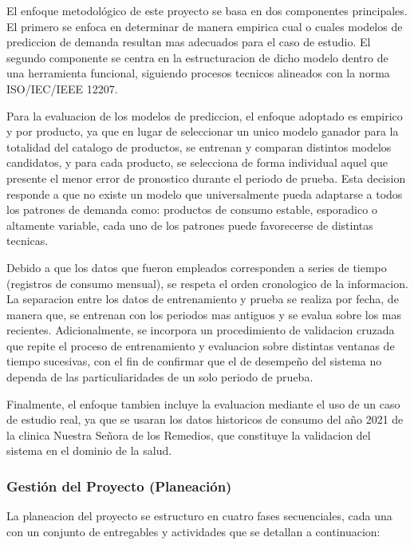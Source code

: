 El enfoque metodológico de este proyecto se basa en dos componentes principales. El primero se enfoca en determinar de manera empirica cual o cuales modelos de prediccion de demanda resultan mas adecuados para el caso de estudio. El segundo componente se centra en la estructuracion de dicho modelo dentro de una herramienta funcional, siguiendo procesos tecnicos alineados con la norma ISO/IEC/IEEE 12207. 

Para la evaluacion de los modelos de prediccion, el enfoque adoptado es empirico y por producto, ya que en lugar de seleccionar un unico modelo ganador para la totalidad del catalogo de productos, se entrenan y comparan distintos modelos candidatos, y para cada producto, se selecciona de forma individual aquel que presente el menor error de pronostico durante el periodo de prueba. Esta decision responde a que no existe un modelo que universalmente pueda adaptarse a todos los patrones de demanda como: productos de consumo estable, esporadico o altamente variable, cada uno de los patrones puede favorecerse de distintas tecnicas.

Debido a que los datos que fueron empleados corresponden a series de tiempo (registros de consumo mensual), se respeta el orden cronologico de la informacion. La separacion entre los datos de entrenamiento y prueba se realiza por fecha, de manera que, se entrenan con los periodos mas antiguos y se evalua sobre los mas recientes. Adicionalmente, se incorpora un procedimiento de validacion cruzada que repite el proceso de entrenamiento y evaluacion sobre distintas ventanas de tiempo sucesivas, con el fin de confirmar que el de desempeño del sistema no dependa de las particuliaridades de un solo periodo de prueba.

Finalmente, el enfoque tambien incluye la evaluacion mediante el uso de un caso de estudio real, ya que se usaran los datos historicos de consumo del año 2021 de la clinica Nuestra Señora de los Remedios, que constituye la validacion del sistema en el dominio de la salud. 

\subsubsection{Gestión del Proyecto (Planeación)}

La planeacion del proyecto se estructuro en cuatro fases secuenciales, cada una con un conjunto de entregables y actividades que se detallan a continuacion:

